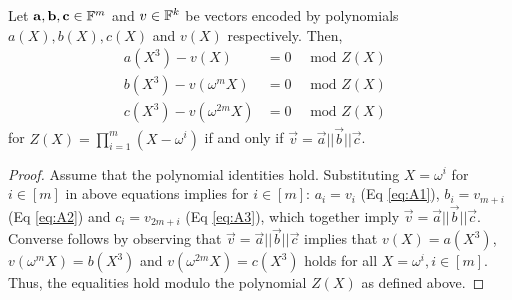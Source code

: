 \begin{lemma}\label{lem:vec-concatenation}
Let $\mathbf{a},\mathbf{b},\mathbf{c}\in \mathbb{F}^m$  and $v\in \mathbb{F}^k$ be vectors encoded by polynomials
$a(X),b(X),c(X)$ and $v(X)$ respectively. Then,
\begin{align}
    a(X^3) - v(X)  &= 0  \quad \text{ mod $Z(X)$ } \tag{A1}\label{eq:A1}\\
    b(X^3) - v(\omega^m X)  &= 0   \quad \text{ mod $Z(X)$ } \tag{A2}\label{eq:A2}\\
    c(X^3) - v(\omega^{2m} X) &= 0 \quad \text{ mod $Z(X)$ } \tag{A3}\label{eq:A3}
\end{align}
for $Z(X)=\prod_{i=1}^m (X-\omega^i)$ if and only if $\vec{v}=\vec{a}||\vec{b}||\vec{c}$.
\end{lemma}
\begin{proof}
    Assume that the polynomial identities hold. Substituting $X=\omega^i$ for $i\in [m]$ in above equations implies
    for $i\in [m]$: $a_i=v_i$ (Eq \eqref{eq:A1}), $b_i=v_{m+i}$ (Eq \eqref{eq:A2}) and $c_i=v_{2m+i}$ (Eq \eqref{eq:A3}),
    which together imply $\vec{v}=\vec{a}||\vec{b}||\vec{c}$. Converse follows by observing that $\vec{v}=\vec{a}||\vec{b}||\vec{c}$
    implies that $v(X) = a(X^3)$, $v(\omega^m X)=b(X^3)$ and $v(\omega^{2m} X)=c(X^3)$ holds for all $X=\omega^i, i\in [m]$.
    Thus, the equalities hold modulo the polynomial $Z(X)$ as defined above.
\end{proof}



